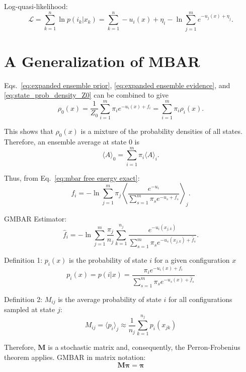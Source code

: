 \documentclass[aip,jcp,reprint,amsmath,amssymb]{revtex4-1}
\newcommand{\mt}[1]{\boldsymbol{\mathbf{#1}}}           %
\newcommand{\vt}[1]{\boldsymbol{\mathbf{#1}}}           %
\begin{document}
Log-quasi-likelihood:\cite{Doss_2014}
\begin{equation*}
\mathcal L = \sum_{k=1}^n \ln p(i_k|x_k) = \sum_{k=1}^n -u_i(x) + \eta_i - \ln \sum_{j=1}^m e^{-u_j(x) + \eta_j}.
\end{equation*}


\section{A Generalization of MBAR}

Eqs.~\eqref{eq:expanded ensemble prior}, \eqref{eq:expanded ensemble evidence}, and \eqref{eq:state_prob_density_Z0} can be combined to give
\begin{equation*}
\rho_0(x) = \frac{1}{Z_0} \sum_{i=1}^m \pi_i e^{-u_i(x) + f_i} = \sum_{i=1}^m \pi_i \rho_i(x).
\end{equation*}

This shows that $\rho_0(x)$ is a mixture of the probability densities of all states. Therefore, an ensemble average at state $0$ is
\begin{equation*}
\langle A \rangle_0 = \sum_{i=1}^m \pi_i \langle A \rangle_i.
\end{equation*}

Thus, from Eq.~\eqref{eq:mbar free energy exact}:
\begin{equation}
f_i = -\ln \sum_{j=1}^m \pi_j \left\langle \frac{e^{-u_i}}{\sum_{s=1}^m \pi_s e^{-u_s + f_s}} \right\rangle_j.
\end{equation}

GMBAR Estimator:
\begin{equation}
\hat f_i = -\ln \sum_{j=1}^m \frac{\pi_j}{n_j} \sum_{k=1}^{n_j} \frac{e^{-u_i(x_{j,k})}}{\sum_{s=1}^m \pi_s e^{-u_s(x_{j,k}) + \hat f_s}}.
\end{equation}


Definition 1: $p_i(x)$ is the probability of state $i$ for a given configuration $x$
\begin{equation}
p_i(x) = p(i|x) = \frac{\pi_i e^{-u_i(x) + f_i}}{\sum_{s=1}^m \pi_s e^{-u_s(x) + \hat f_s}}
\end{equation}

Definition 2: $M_{ij}$ is the average probability of state $i$ for all configurations sampled at state $j$:
\begin{equation*}
M_{ij} = \langle p_i \rangle_j \approx \frac{1}{n_j} \sum_{k=1}^{n_j} p_i(x_{jk})
\end{equation*}

Therefore, $\vt M$ is a stochastic matrix and, consequently, the Perron-Frobenius theorem applies. GMBAR in matrix notation:
\begin{equation*}
\mt M \vt \pi = \vt \pi
\end{equation*}
\end{document}
